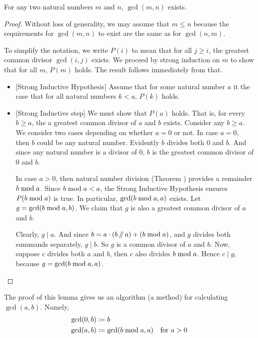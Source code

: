 \begin{thm}
 For any two natural numbers $m$ and $n$, $\gcd(m,n)$ exists.

\begin{proof}
  Without loss of generality, we may assume that $m\leq n$ because the requirements for $\gcd(m,n)$ to exist are the
same as for $\gcd(n,m)$.

To simplify the notation, we write $P(i)$ to mean that for all $j\geq i$, the greatest common divisor $\gcd(i,j)$ exists.
We proceed by strong induction on $m$ to show that for all $m$, $P(m)$ holds. The result follows immediately from that.
  \begin{itemize}
  \item{}[Strong Inductive Hypothesis] Assume that for some natural number $a$ it the case that for all natural numbers $k<a$, $P(k)$ holds.

  \item{}[Strong Inductive step] We must show that $P(a)$ holds. That is, for every $b\geq a$, the  
a greatest common divisor of $a$ and $b$ exists. Consider any $b\geq a$. 
   We consider two cases depending on whether $a=0$ or not.  In
    case $a=0$, then $b$ could be any natural number. Evidently $b$ divides both $0$ and $b$. And since   
    any natural number is a divisor of $0$, $b$ is the greatest common divisor of $0$ and $b$.
	
    In case $a>0$, then natural number division (Theorem \label{thm:division}) provides a remainder
    $b\bmod a$.  Since $b\bmod a < a$, the Strong Inductive
    Hypothesis ensures $P(b\bmod a)$ is true. In particular, $\gcd(b\bmod a, a)$ exists.   
    Let $g=\gcd(b\bmod a,b)$.
    We claim that $g$ is also a greatest common divisor of $a$ and $b$.

    Clearly, $g\mid a$. And since $b= a\cdot (b\mathop{/\mkern-5mu/} a) + (b\bmod a)$, and $g$ divides both summands separately,  $g\mid b$. 
	So $g$ is a common divisor of $a$ and $b$. Now, suppose $c$ divides both $a$ and $b$, then $c$ also divides
	$b\bmod a$. Hence $c\mid g$, because $g=\gcd(b\bmod a,a)$.
  \end{itemize}
\end{proof}
\end{thm}

The proof of this lemma gives us an algorithm (a method)
for calculating $\gcd(a,b)$. Namely, 
\begin{align*}
  \gcd(0,b) &\coloneqq b\\
  \gcd(a,b) &\coloneqq \gcd(b\bmod a, a) &\text{for $a > 0$}
\end{align*}

